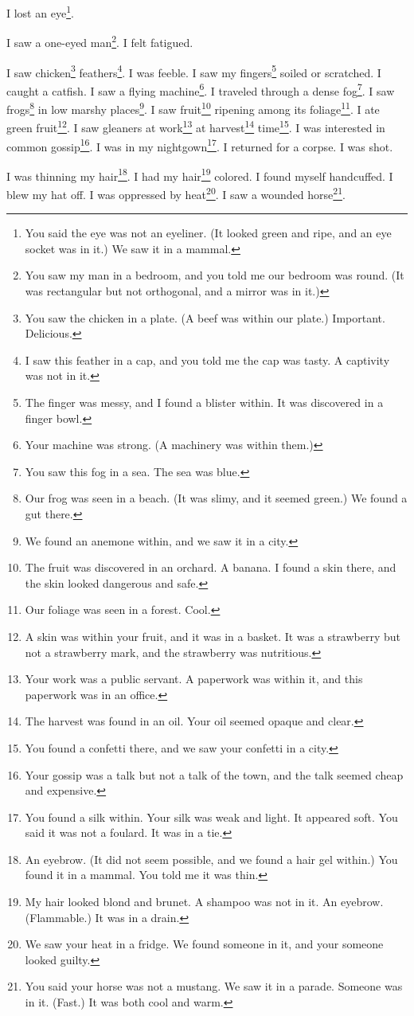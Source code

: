 \documentclass[12pt]{book}
\begin{document}
 I lost an eye\footnote{You said the eye was not an eyeliner. (It looked green and ripe, and an eye socket was in it.) We saw it in a mammal.}. 

 I saw a one-eyed man\footnote{You saw my man in a bedroom, and you told me our bedroom was round. (It was rectangular but not orthogonal, and a mirror was in it.)}. I felt fatigued. 

 I saw chicken\footnote{You saw the chicken in a plate. (A beef was within our plate.) Important. Delicious.} feathers\footnote{I saw this feather in a cap, and you told me the cap was tasty. A captivity was not in it.}. I was feeble. I saw my fingers\footnote{The finger was messy, and I found a blister within. It was discovered in a finger bowl.} soiled or scratched. I caught a catfish. I saw a flying machine\footnote{Your machine was strong. (A machinery was within them.)}. I traveled through a dense fog\footnote{You saw this fog in a sea. The sea was blue.}. I saw frogs\footnote{Our frog was seen in a beach. (It was slimy, and it seemed green.) We found a gut there.} in low marshy places\footnote{We found an anemone within, and we saw it in a city.}. I saw fruit\footnote{The fruit was discovered in an orchard. A banana. I found a skin there, and the skin looked dangerous and safe.} ripening among its foliage\footnote{Our foliage was seen in a forest. Cool.}. I ate green fruit\footnote{A skin was within your fruit, and it was in a basket. It was a strawberry but not a strawberry mark, and the strawberry was nutritious.}. I saw gleaners at work\footnote{Your work was a public servant. A paperwork was within it, and this paperwork was in an office.} at harvest\footnote{The harvest was found in an oil. Your oil seemed opaque and clear.} time\footnote{You found a confetti there, and we saw your confetti in a city.}. I was interested in common gossip\footnote{Your gossip was a talk but not a talk of the town, and the talk seemed cheap and expensive.}. I was in my nightgown\footnote{You found a silk within. Your silk was weak and light. It appeared soft. You said it was not a foulard. It was in a tie.}. I returned for a corpse. I was shot. 

 I was thinning my hair\footnote{An eyebrow. (It did not seem possible, and we found a hair gel within.) You found it in a mammal. You told me it was thin.}. I had my hair\footnote{My hair looked blond and brunet. A shampoo was not in it. An eyebrow. (Flammable.) It was in a drain.} colored. I found myself handcuffed. I blew my hat off. I was oppressed by heat\footnote{We saw your heat in a fridge. We found someone in it, and your someone looked guilty.}. I saw a wounded horse\footnote{You said your horse was not a mustang. We saw it in a parade. Someone was in it. (Fast.) It was both cool and warm.}. 
\end{document}

